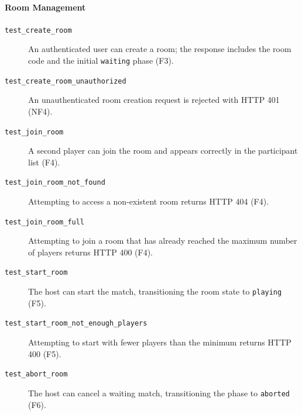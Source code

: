 \documentclass{scrartcl}
\begin{document}
\paragraph{Room Management}
\begin{description}
  \item[\texttt{test\_create\_room}] An authenticated user can create a room;
  the response includes the room code and the initial \texttt{waiting} phase (F3).

  \item[\texttt{test\_create\_room\_unauthorized}] An unauthenticated room
  creation request is rejected with HTTP 401 (NF4).

  \item[\texttt{test\_join\_room}] A second player can join the room and
  appears correctly in the participant list (F4).

  \item[\texttt{test\_join\_room\_not\_found}] Attempting to access a
  non-existent room returns HTTP 404 (F4).

  \item[\texttt{test\_join\_room\_full}] Attempting to join a room that has
  already reached the maximum number of players returns HTTP 400 (F4).

  \item[\texttt{test\_start\_room}] The host can start the match, transitioning
  the room state to \texttt{playing} (F5).

  \item[\texttt{test\_start\_room\_not\_enough\_players}] Attempting to start
  with fewer players than the minimum returns HTTP 400 (F5).

  \item[\texttt{test\_abort\_room}] The host can cancel a waiting match,
  transitioning the phase to \texttt{aborted} (F6).
\end{description}
\end{document}
